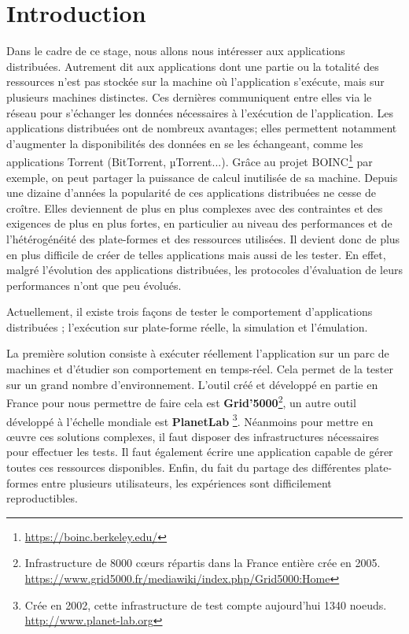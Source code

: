 \section{Introduction}



Dans le cadre de ce stage, nous allons nous intéresser aux applications
distribuées. Autrement dit aux applications dont une partie ou la totalité des
ressources n'est pas stockée sur la machine où l'application s'exécute, mais sur
plusieurs machines distinctes. Ces dernières communiquent entre elles via le
réseau pour s'échanger les données nécessaires à l'exécution de
l'application. Les applications distribuées ont de nombreux avantages; elles
permettent notamment d'augmenter la disponibilités des données en se les
échangeant, comme les applications Torrent (BitTorrent, $µ$Torrent...). Grâce au
projet BOINC\footnote{\url{https://boinc.berkeley.edu/}} par exemple, on peut
partager la puissance de calcul inutilisée de sa machine. Depuis une dizaine
d'années la popularité de ces applications distribuées ne cesse de
croître. Elles deviennent de plus en plus complexes avec des contraintes et des
exigences de plus en plus fortes, en particulier au niveau des performances et
de l'hétérogénéité des plate-formes et des ressources utilisées. Il devient donc
de plus en plus difficile de créer de telles applications mais aussi de les
tester. En effet, malgré l'évolution des applications distribuées, les
protocoles d'évaluation de leurs performances n'ont que peu évolués.
\newline

Actuellement, il existe trois façons de tester le comportement d'applications
distribuées \citep{gustedt2009experimental}; l'exécution sur plate-forme réelle,
la simulation et l'émulation.

La première solution consiste à exécuter réellement l'application sur un parc de
machines et d'étudier son comportement en temps-réel. Cela permet de la tester
sur un grand nombre d'environnement. L'outil créé et développé en partie en
France pour nous permettre de faire cela est
\textbf{Grid'5000}\footnote{Infrastructure de 8000 c\oe urs répartis dans la
  France entière crée en
  2005. \\ \url{https://www.grid5000.fr/mediawiki/index.php/Grid5000:Home}}\citep{GRID5000},
un autre outil développé à l'échelle mondiale est
\textbf{PlanetLab} \footnote{Crée en 2002, cette infrastructure de test compte
  aujourd'hui 1340 noeuds. \\ \url{http://www.planet-lab.org}}. Néanmoins pour
mettre en \oe uvre ces solutions complexes, il faut disposer des infrastructures
nécessaires pour effectuer les tests. Il faut également écrire une application
capable de gérer toutes ces ressources disponibles. Enfin, du fait du partage
des différentes plate-formes entre plusieurs utilisateurs, les expériences sont
difficilement reproductibles.

